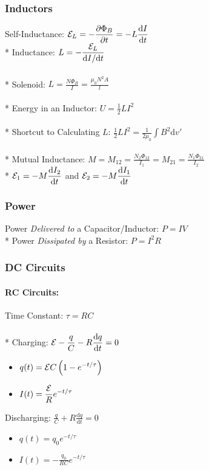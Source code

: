 \subsubsection{Inductors}
Self-Inductance: \(\displaystyle{\cal E}_L=-\frac{\partial\Phi_B}{\partial t}=-L\frac{\mathrm{d} I}{\mathrm{d} t}\)\\*
Inductance: \(\displaystyle L=-\frac{{\cal E}_L}{{\mathrm{d} I}{/\mathrm{d} t}}\)\\\\*
Solenoid: \(\displaystyle L=\frac{N\Phi_B}{I}=\frac{\mu_0 N^2 A}{l}\)\\\\*
Energy in an Inductor: \(U=\frac{1}{2}LI^2\)\\\\*
Shortcut to Calculating \(L\): \(\displaystyle \frac{1}{2}LI^2=\frac{1}{2\mu_0}\int B^2\mathrm{d}v'\)\\\\*
Mutual Inductance: \(\displaystyle M=M_{12}=\frac{N_2\Phi_{12}}{I_1}=M_{21}=\frac{N_1\Phi_{21}}{I_2}\)\\*
\(\displaystyle{\cal E}_1=-M\frac{\mathrm{d}I_2}{\mathrm{d}t}\) and \(\displaystyle{\cal E}_2=-M\frac{\mathrm{d}I_1}{\mathrm{d}t}\)

\subsubsection{Power}
Power \emph{Delivered to} a Capacitor/Inductor: \(P=IV\)\\*
Power \emph{Dissipated by} a Resistor: \(P=I^2R\)

\subsubsection{DC Circuits}

\paragraph{RC Circuits:}
Time Constant: \(\tau=RC\)\\\\*
Charging: \(\displaystyle{\cal E} - \frac{q}{C}-R\frac{\mathrm{d}q}{\mathrm{d}t}=0\)
\begin{itemize}
\item \(\displaystyle q(t)={\cal E}C\left(1-e^{-t/\tau}\right)\)
\item \(\displaystyle I(t)=\frac{{\cal E}}{R}e^{-t/\tau}\)
\end{itemize}
Discharging: \(\displaystyle \frac{q}{C}+R\frac{\mathrm{d}q}{\mathrm{d}t}=0\)
\begin{itemize}
\item \(\displaystyle q(t)=q_0e^{-t/\tau}\)
\item \(\displaystyle I(t)=-\frac{q_0}{RC}e^{-t/\tau}\)
\end{itemize}


